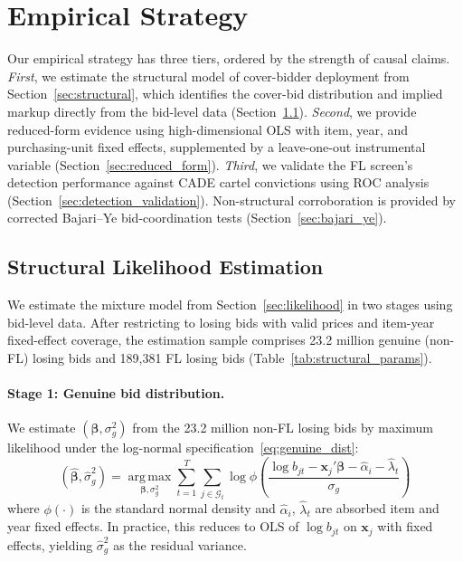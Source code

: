 

\section{Empirical Strategy}
\label{sec:empirical}

Our empirical strategy has three tiers, ordered by the strength of causal
claims. \emph{First}, we estimate the structural model of cover-bidder
deployment from Section~\ref{sec:structural}, which identifies the
cover-bid distribution and implied markup directly from the bid-level
data (Section~\ref{sec:structural_estimation}). \emph{Second}, we
provide reduced-form evidence using high-dimensional OLS with item, year,
and purchasing-unit fixed effects, supplemented by a leave-one-out
instrumental variable (Section~\ref{sec:reduced_form}). \emph{Third}, we
validate the FL screen's detection performance against CADE cartel
convictions using ROC analysis (Section~\ref{sec:detection_validation}).
Non-structural corroboration is provided by corrected Bajari--Ye
bid-coordination tests (Section~\ref{sec:bajari_ye}).


\subsection{Structural Likelihood Estimation}
\label{sec:structural_estimation}

We estimate the mixture model from Section~\ref{sec:likelihood} in two stages using bid-level data. After restricting to losing bids with valid prices and item-year fixed-effect coverage, the estimation sample comprises 23.2 million genuine (non-FL) losing bids and 189,381 FL losing bids (Table~\ref{tab:structural_params}).

\paragraph{Stage 1: Genuine bid distribution.}
We estimate $(\boldsymbol{\beta}, \sigma_g^2)$ from the 23.2 million non-FL losing bids by maximum likelihood under the log-normal specification~\eqref{eq:genuine_dist}:
\begin{equation}
  (\hat{\boldsymbol{\beta}}, \hat{\sigma}_g^2) =
  \operatorname*{arg\,max}_{\boldsymbol{\beta}, \sigma_g^2}
  \sum_{t=1}^{T} \sum_{j \in \mathcal{G}_t}
  \log \phi\!\left(
    \frac{\log b_{jt} - \mathbf{x}_j'\boldsymbol{\beta}
    - \hat{\alpha}_i - \hat{\lambda}_t}{\sigma_g}
  \right)
  \label{eq:mle_genuine}
\end{equation}
where $\phi(\cdot)$ is the standard normal density and $\hat{\alpha}_i$, $\hat{\lambda}_t$ are absorbed item and year fixed effects. In practice, this reduces to OLS of $\log b_{jt}$ on $\mathbf{x}_j$ with fixed effects, yielding $\hat{\sigma}_g^2$ as the residual variance.

